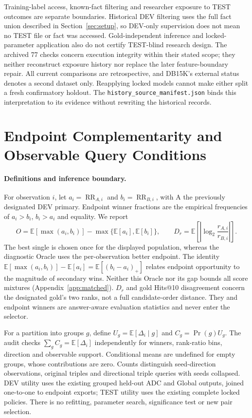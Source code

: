 \documentclass[11pt,a4paper]{article}
\newcommand{\RR}{\operatorname{RR}}
\newcommand{\E}{\mathbb{E}}
\begin{document}
Training-label access, known-fact filtering and researcher exposure to TEST outcomes are separate boundaries. Historical DEV filtering uses the full fact union described in Section~\ref{sec:setup}, so DEV-only supervision does not mean no TEST file or fact was accessed. Gold-independent inference and locked-parameter application also do not certify TEST-blind research design. The archived 77 checks concern execution integrity within their stated scope; they neither reconstruct exposure history nor replace the later feature-boundary repair. All current comparisons are retrospective, and DB15K's external status denotes a second dataset only. Reapplying locked models cannot make either split a fresh confirmatory holdout. The \texttt{history\_source\_manifest.json} binds this interpretation to its evidence without rewriting the historical records.

\FloatBarrier
\section{Endpoint Complementarity and Observable Query Conditions}
\label{app:complementarity}

\paragraph{Definitions and inference boundary.}
For observation $i$, let $a_i=\RR_{A,i}$ and $b_i=\RR_{B,i}$, with A the previously designated DEV primary. Endpoint winner fractions are the empirical frequencies of $a_i>b_i$, $b_i>a_i$ and equality. We report
\begin{equation}
O=\E[\max(a_i,b_i)]-\max\{\E[a_i],\E[b_i]\},\qquad
D_r=\E\left[\left|\log_2\frac{r_{A,i}}{r_{B,i}}\right|\right].
\label{eq:complementarity}
\end{equation}
The best single is chosen once for the displayed population, whereas the diagnostic Oracle uses the per-observation better endpoint. The identity $\E[\max(a_i,b_i)]-\E[a_i]=\E[(b_i-a_i)_+]$ relates endpoint opportunity to the magnitude of secondary wins. Neither this Oracle nor its gap bounds all score mixtures (Appendix~\ref{app:matched}). $D_r$ and gold Hits@10 disagreement concern the designated gold's two ranks, not a full candidate-order distance. They and endpoint winners are answer-aware evaluation statistics and never enter the selector.

For a partition into groups $g$, define $U_g=\E[\Delta_i\mid g]$ and $C_g=\Pr(g)U_g$. The audit checks $\sum_g C_g=\E[\Delta_i]$ independently for winners, rank-ratio bins, direction and observable support. Conditional means are undefined for empty groups, whose contributions are zero. Counts distinguish seed-direction observations, original triples and directional triple queries with seeds collapsed. DEV utility uses the existing grouped held-out ADC and Global outputs, joined one-to-one to endpoint exports; TEST utility uses the existing complete locked policies. There is no refitting, parameter search, significance test or new pair selection.
\end{document}
